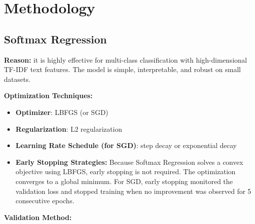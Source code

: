 \documentclass[12pt]{article}
\begin{document}
\newpage
\section{Methodology}

\subsection{Softmax Regression}

\textbf{Reason:} it is highly effective for multi-class classification with high-dimensional TF-IDF text features. The model is simple, interpretable, and robust on small datasets.

\textbf{Optimization Techniques:}
    \begin{itemize}
        \item \textbf{Optimizer}: LBFGS (or SGD)
        \item \textbf{Regularization}: L2 regularization
        \item \textbf{Learning Rate Schedule (for SGD)}: step decay or exponential decay 
        \item \textbf{Early Stopping Strategies:} Because Softmax Regression solves a convex objective using LBFGS, early stopping is not required. The optimization converges to a global minimum. For SGD, early stopping monitored the validation loss and stopped training when no improvement was observed for 5 consecutive epochs.
        
    \end{itemize}
\textbf{Validation Method:}
\end{document}
